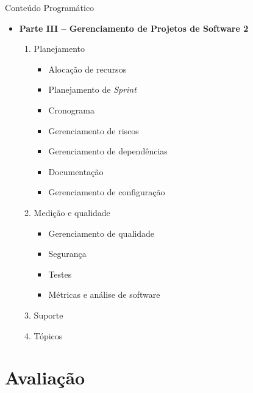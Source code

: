 \documentclass{beamer}
\begin{document}
\begin{frame}{Conteúdo Programático}
    \begin{itemize}
        \justifying
        \item \textbf{Parte III – Gerenciamento de Projetos de Software 2}
            \begin{enumerate}
                \justifying
                \item Planejamento
                	\begin{itemize}
                		\justifying
                		\item Alocação de recursos
                		\item Planejamento de \textit{Sprint}
                		\item Cronograma
                		\item Gerenciamento de riscos
                		\item Gerenciamento de dependências
                		\item Documentação
                		\item Gerenciamento de configuração
                	\end{itemize}
                \item Medição e qualidade
                	\begin{itemize}
                		\justifying
                		\item Gerenciamento de qualidade
                		\item Segurança
                		\item Testes
                		\item Métricas e análise de software
                	\end{itemize}
                \item Suporte
                \item Tópicos
            \end{enumerate}
    \end{itemize}
\end{frame}

\section{Avaliação}
\end{document}
